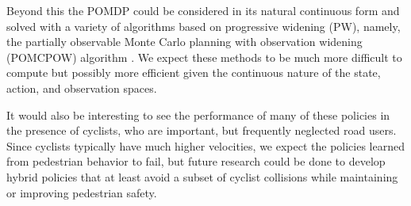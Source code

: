 \documentclass[conference]{IEEEtran}
\begin{document}
Beyond this the POMDP could be considered in its natural continuous form and solved with a variety of algorithms based on progressive widening (PW), namely, the partially observable Monte Carlo planning with observation widening (POMCPOW) algorithm \cite{Sunberg2018OnlineSpaces}. We expect these methods to be much more difficult to compute but possibly more efficient given the continuous nature of the state, action, and observation spaces.

It would also be interesting to see the performance of many of these policies in the presence of cyclists, who are important, but frequently neglected road users. Since cyclists typically have much higher velocities, we expect the policies learned from pedestrian behavior to fail, but future research could be done to develop hybrid policies that at least avoid a subset of cyclist collisions while maintaining or improving pedestrian safety.



\end{document}
